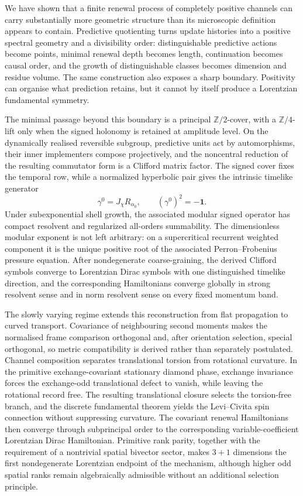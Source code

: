 \documentclass[11pt]{article}
\theoremstyle{definition}
\theoremstyle{remark}
\newcommand{\Z}{\mathbb{Z}}
\newcommand{\one}{\mathbf{1}}
\begin{document}
We have shown that a finite renewal process of completely positive channels
can carry substantially more geometric structure than its microscopic
definition appears to contain.  Predictive quotienting turns update histories
into a positive spectral geometry and a divisibility order: distinguishable
predictive actions become points, minimal renewal depth becomes length,
continuation becomes causal order, and the growth of distinguishable classes
becomes dimension and residue volume.  The same construction also exposes a
sharp boundary.  Positivity can organise what prediction retains, but it
cannot by itself produce a Lorentzian fundamental symmetry.

The minimal passage beyond this boundary is a principal \(\Z/2\)-cover, with a
\(\Z/4\)-lift only when the signed holonomy is retained at amplitude level.
On the dynamically realised reversible subgroup, predictive units act by
automorphisms, their inner implementers compose projectively, and the
noncentral reduction of the resulting commutator form is a Clifford matrix
factor.  The signed cover fixes the temporal row, while a normalized
hyperbolic pair gives the intrinsic timelike generator
\[
  \gamma^0=J_\chi R_{\alpha_0},
  \qquad
  (\gamma^0)^2=-\one .
\]
Under subexponential shell growth, the associated modular signed operator has
compact resolvent and regularized all-orders summability.  The dimensionless
modular exponent is not left arbitrary: on a supercritical recurrent weighted
component it is the unique positive root of the associated Perron--Frobenius
pressure equation.  After
nondegenerate coarse-graining, the derived Clifford symbols converge to
Lorentzian Dirac symbols with one distinguished timelike direction, and the
corresponding Hamiltonians converge globally in strong resolvent sense and in
norm resolvent sense on every fixed momentum band.

The slowly varying regime extends this reconstruction from flat propagation
to curved transport.  Covariance of neighbouring second moments makes the
normalised frame comparison orthogonal and, after orientation selection,
special orthogonal, so metric compatibility is derived rather than separately
postulated.  Channel composition separates translational torsion from
rotational curvature.  In the primitive exchange-covariant stationary
diamond phase, exchange invariance forces the exchange-odd translational
defect to vanish, while leaving the rotational record free.  The resulting
translational closure selects the torsion-free branch, and the discrete
fundamental theorem yields the Levi--Civita spin connection without
suppressing curvature.  The covariant renewal Hamiltonians then converge
through subprincipal order to the corresponding variable-coefficient
Lorentzian Dirac Hamiltonian.  Primitive rank parity, together with the
requirement of a nontrivial spatial bivector sector, makes \(3+1\) dimensions
the first nondegenerate Lorentzian endpoint of the mechanism, although higher
odd spatial ranks remain algebraically admissible without an additional
selection principle.
\end{document}
